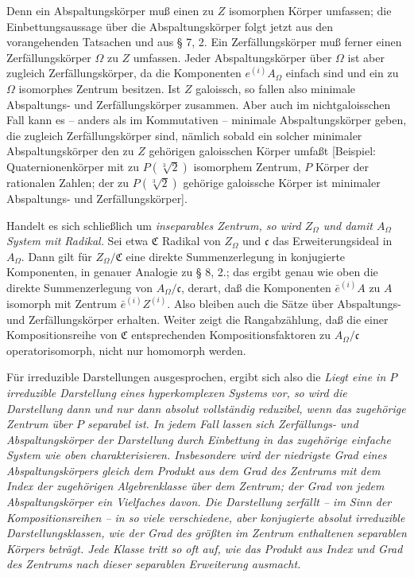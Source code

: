 Denn ein Abspaltungskörper muß einen zu \(Z\) isomorphen Körper umfassen; die Einbettungsaussage über die Abspaltungskörper folgt jetzt aus den vorangehenden Tatsachen und aus § 7, 2. Ein Zerfällungskörper muß ferner einen Zerfällungskörper \(\Omega\) zu \(Z\) umfassen. Jeder Abspaltungskörper über \(\Omega\) ist aber zugleich Zerfällungskörper, da die Komponenten \(e^{(i)}A_\Omega\) einfach sind und ein zu \(\Omega\) isomorphes Zentrum besitzen. Ist \(Z\) galoissch, so fallen also minimale Abspaltungs- und Zerfällungskörper zusammen. Aber auch im nichtgaloisschen Fall kann es -- anders als im Kommutativen -- minimale Abspaltungskörper geben, die zugleich Zerfällungskörper sind, nämlich sobald ein solcher minimaler Abspaltungskörper den zu \(Z\) gehörigen galoisschen Körper umfaßt [Beispiel: Quaternionenkörper mit zu \(P(\sqrt[3]{2})\) isomorphem Zentrum, \(P\) Körper der rationalen Zahlen; der zu \(P(\sqrt[3]{2})\) gehörige galoissche Körper ist minimaler Abspaltungs- und Zerfällungskörper].

Handelt es sich schließlich um \emph{inseparables Zentrum, so wird \(Z_\Omega\) und damit \(A_\Omega\) System mit Radikal.} Sei etwa \(\mathfrak C\) Radikal von \(Z_\Omega\) und \(\mathfrak c\) das Erweiterungsideal in \(A_\Omega\). Dann gilt für \(Z_\Omega/\mathfrak C\) eine direkte Summenzerlegung in konjugierte Komponenten, in genauer Analogie zu § 8, 2.; das ergibt genau wie oben die direkte Summenzerlegung von \(A_\Omega/\mathfrak c\), derart, daß die Komponenten \(\bar e^{(i)}A\) zu \(A\) isomorph mit Zentrum \(\bar e^{(i)}Z^{(i)}\). Also bleiben auch die Sätze über Abspaltungs- und Zerfällungskörper erhalten. Weiter zeigt die Rangabzählung, daß die einer Kompositionsreihe von \(\mathfrak C\) entsprechenden Kompositionsfaktoren zu \(A_\Omega/\mathfrak c\) operatorisomorph, nicht nur homomorph werden.

Für irreduzible Darstellungen ausgesprochen, ergibt sich also die \textbf{} \emph{Liegt eine in \(P\) irreduzible Darstellung eines hyperkomplexen Systems vor, so wird die Darstellung dann und nur dann absolut vollständig reduzibel, wenn das zugehörige Zentrum über \(P\) separabel ist. In jedem Fall lassen sich Zerfällungs- und Abspaltungskörper der Darstellung durch Einbettung in das zugehörige einfache System wie oben charakterisieren. Insbesondere wird der niedrigste Grad eines Abspaltungskörpers gleich dem Produkt aus dem Grad des Zentrums mit dem Index der zugehörigen Algebrenklasse über dem Zentrum; der Grad von jedem Abspaltungskörper ein Vielfaches davon. Die Darstellung zerfällt -- im Sinn der Kompositionsreihen -- in so viele verschiedene, aber konjugierte absolut irreduzible Darstellungsklassen, wie der Grad des größten im Zentrum enthaltenen separablen Körpers beträgt. Jede Klasse tritt so oft auf, wie das Produkt aus Index und Grad des Zentrums nach dieser separablen Erweiterung ausmacht.}

